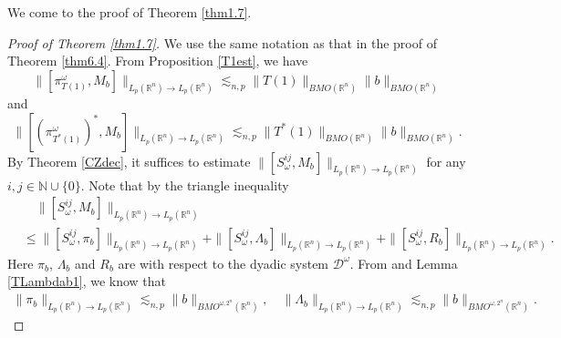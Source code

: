 \documentclass[oneside,english,a4wide]{amsart}
\numberwithin{equation}{section}
\numberwithin{figure}{section}
\theoremstyle{plain}
\theoremstyle{plain}
\theoremstyle{definition}
\theoremstyle{plain}
\theoremstyle{remark}
\theoremstyle{definition}
\theoremstyle{remark}
\theoremstyle{definition}
\newcommand{\8}{\infty}
\begin{document}
We come to the proof of Theorem \ref{thm1.7}.
\begin{proof}[Proof of Theorem \ref{thm1.7}]
We use the same notation as that in the proof of Theorem \ref{thm6.4}. From Proposition \ref{T1est}, we have
\begin{equation*}
	\|[\pi_{T(1)}^{\omega}, M_b]\|_{L_p(\mathbb{R}^n)\to L_p(\mathbb{R}^n)}\lesssim_{n,p}\|T(1)\|_{BMO(\mathbb{R}^n)} \|b\|_{BMO(\mathbb{R}^n)}
\end{equation*}
and
\begin{equation*}
	\|[(\pi_{T^*(1)}^{\omega})^*, M_b]\|_{L_p(\mathbb{R}^n)\to L_p(\mathbb{R}^n)}\lesssim_{n,p} \|T^*(1)\|_{BMO(\mathbb{R}^n)} \|b\|_{BMO(\mathbb{R}^n)}.
\end{equation*}
By Theorem \ref{CZdec}, it suffices to estimate $\|[S_\omega^{ij}, M_b]\|_{L_p(\mathbb{R}^n)\to L_p(\mathbb{R}^n)}$ for any $i, j\in \mathbb{N}\cup\{0\}$.
Note that by the triangle inequality
\begin{equation*}
	\begin{aligned}
		{}&\quad\|[S_\omega^{ij},M_b]\|_{L_p(\mathbb{R}^n)\to L_p(\mathbb{R}^n)}\\&\le \|[S_\omega^{ij},\pi_b]\|_{L_p(\mathbb{R}^n)\to L_p(\mathbb{R}^n)}+\|[S_\omega^{ij},\varLambda_b]\|_{L_p(\mathbb{R}^n)\to L_p(\mathbb{R}^n)}
		+\|[S_\omega^{ij},R_b]\|_{L_p(\mathbb{R}^n)\to L_p(\mathbb{R}^n)}.
	\end{aligned}
\end{equation*}
Here $\pi_b$, $\varLambda_b$ and $R_b$ are with respect to the dyadic system $\mathcal{ D}^\omega$. From \cite{CP} and Lemma \ref{TLambdab1}, we know that
\begin{equation*}
	\begin{aligned}
		\|\pi_b\|_{L_p(\mathbb{R}^n)\to L_p(\mathbb{R}^n)}\lesssim_{n,p}\|b\|_{BMO^{\omega, 2^n}(\mathbb{R}^n)},\quad \|\varLambda_b\|_{L_p(\mathbb{R}^n)\to L_p(\mathbb{R}^n)}\lesssim_{n,p }\|b\|_{BMO^{\omega, 2^n}(\mathbb{R}^n)}.

\end{aligned}
\end{equation*}
\end{proof}
\end{document}

